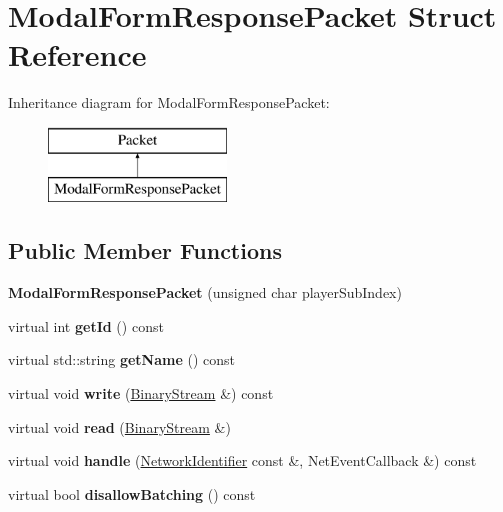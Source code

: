 \hypertarget{struct_modal_form_response_packet}{}\section{Modal\+Form\+Response\+Packet Struct Reference}
\label{struct_modal_form_response_packet}
Inheritance diagram for Modal\+Form\+Response\+Packet\+:\begin{figure}[H]
\begin{center}
\leavevmode
\includegraphics[height=2.000000cm]{struct_modal_form_response_packet}
\end{center}
\end{figure}
\subsection*{Public Member Functions}
\begin{DoxyCompactItemize}
\item 
\mbox{\label{struct_modal_form_response_packet_abd8152c9db848137d9db22bc8ebc0820}} 
{\bfseries Modal\+Form\+Response\+Packet} (unsigned char player\+Sub\+Index)
\item 
\mbox{\label{struct_modal_form_response_packet_acd7bb3016c90cafe489aa31352058bac}} 
virtual int {\bfseries get\+Id} () const
\item 
\mbox{\label{struct_modal_form_response_packet_a19bb5e40ffcdc58055a4d128c16d23b8}} 
virtual std\+::string {\bfseries get\+Name} () const
\item 
\mbox{\label{struct_modal_form_response_packet_a61ccfceac1fd955a41fc30beeb31909e}} 
virtual void {\bfseries write} (\mbox{\hyperlink{struct_binary_stream}{Binary\+Stream}} \&) const
\item 
\mbox{\label{struct_modal_form_response_packet_af8f8accf040fe9ef5d04702dbdf3288a}} 
virtual void {\bfseries read} (\mbox{\hyperlink{struct_binary_stream}{Binary\+Stream}} \&)
\item 
\mbox{\label{struct_modal_form_response_packet_ad5bc9a5f78f5d14a9602ab1b2162f914}} 
virtual void {\bfseries handle} (\mbox{\hyperlink{struct_network_identifier}{Network\+Identifier}} const \&, Net\+Event\+Callback \&) const
\item 
\mbox{\label{struct_modal_form_response_packet_a0e9e033c7fb5e8a755c48b91ab3a172d}} 
virtual bool {\bfseries disallow\+Batching} () const
\end{DoxyCompactItemize}
